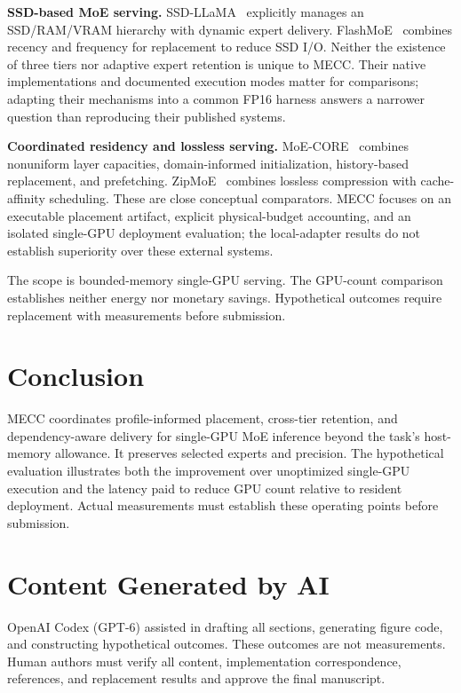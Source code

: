 \documentclass[conference,9pt,letterpaper]{IEEEtran}
\newcommand{\mecc}{\textsc{MECC}}
\begin{document}
\textbf{SSD-based MoE serving.} SSD-LLaMA~\cite{ssdllama} explicitly manages an SSD/RAM/VRAM hierarchy with dynamic expert delivery. FlashMoE~\cite{flashmoe} combines recency and frequency for replacement to reduce SSD I/O. Neither the existence of three tiers nor adaptive expert retention is unique to \mecc{}. Their native implementations and documented execution modes matter for comparisons; adapting their mechanisms into a common FP16 harness answers a narrower question than reproducing their published systems.

\textbf{Coordinated residency and lossless serving.} MoE-CORE~\cite{core} combines nonuniform layer capacities, domain-informed initialization, history-based replacement, and prefetching. ZipMoE~\cite{zipmoe} combines lossless compression with cache-affinity scheduling. These are close conceptual comparators. \mecc{} focuses on an executable placement artifact, explicit physical-budget accounting, and an isolated single-GPU deployment evaluation; the local-adapter results do not establish superiority over these external systems.

The scope is bounded-memory single-GPU serving. The GPU-count comparison establishes neither energy nor monetary savings. Hypothetical outcomes require replacement with measurements before submission.

\section{Conclusion}
\mecc{} coordinates profile-informed placement, cross-tier retention, and dependency-aware delivery for single-GPU MoE inference beyond the task's host-memory allowance. It preserves selected experts and precision. The hypothetical evaluation illustrates both the improvement over unoptimized single-GPU execution and the latency paid to reduce GPU count relative to resident deployment. Actual measurements must establish these operating points before submission.

\section*{Content Generated by AI}
OpenAI Codex (GPT-6) assisted in drafting all sections, generating figure code, and constructing hypothetical outcomes. These outcomes are not measurements. Human authors must verify all content, implementation correspondence, references, and replacement results and approve the final manuscript.

\clearpage
{}


\end{document}
